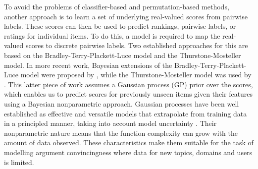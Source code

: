 To avoid the problems of classifier-based and permutation-based methods, 
another approach is to learn a set of underlying real-valued scores from pairwise labels.
These scores can then be used to predict rankings, pairwise labels, or ratings for individual items.
To do this, a model is required to map the real-valued scores to discrete pairwise labels.
Two established approaches for this are based on the Bradley-Terry-Plackett-Luce model \cite{bradley1952rank,luce1959possible,plackett1975analysis}
and the Thurstone-Mosteller model\cite{thurstone1927law,mosteller2006remarks}.
In more recent work, Bayesian extensions of the Bradley-Terry-Plackett-Luce model
were proposed by \cite{guiver2009bayesian,volkovs_new_2014}, 
while the Thurstone-Mosteller model was used by \cite{chu2005preference}.
This latter piece of work assumes a Gaussian process (GP) prior over the scores,
which enables us to predict scores for previously unseen items given their features 
using a Bayesian nonparametric approach.
Gaussian processes have been well established as effective and versatile models that
extrapolate from training data in a principled manner, taking into account model uncertainty
\cite{rasmussen_gaussian_2006}.
Their nonparametric nature means that the function complexity can grow with the amount of data observed.
These characteristics make them suitable for the task of modelling argument convincingness
where data for new topics, domains and users is limited. 

